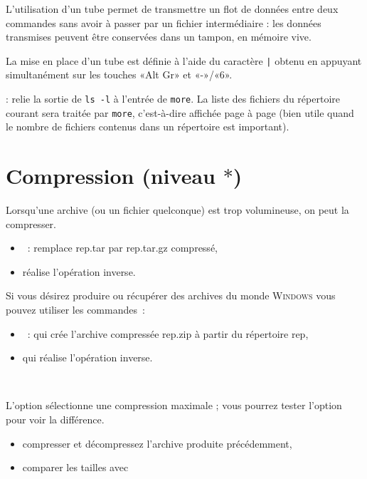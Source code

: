 \documentclass[a4paper,11pt]{article}
\begin{document}
L'utilisation d'un tube permet de transmettre un flot de données entre deux
commandes sans avoir à passer par un fichier intermédiaire : les données
transmises peuvent être conservées dans un tampon, en mémoire vive.

La mise en place d'un tube est définie à l'aide du caractère \verb!|! obtenu
en appuyant simultanément sur les touches «Alt Gr» et «-»/«6».

 : relie la sortie de  \verb!ls -l! à l'entrée de
\verb!more!. La liste des fichiers du répertoire courant sera traitée par
\verb!more!, c'est-à-dire affichée page à page (bien utile quand le nombre de
fichiers contenus dans un répertoire est important).

\section{Compression (niveau $*$)}
Lorsqu'une archive (ou un fichier quelconque) est trop volumineuse, on
peut la compresser.

\begin{itemize}
  \item {} : remplace rep.tar par rep.tar.gz compressé,
  \item {} réalise l'opération inverse.
\end{itemize}

Si vous désirez produire ou récupérer des archives du monde
\textsc{Windows} vous pouvez utiliser les commandes :
\begin{itemize}
  \item {} : qui crée l'archive compressée rep.zip à
        partir du répertoire rep,
  \item {} qui réalise l'opération inverse.
\end{itemize}

\

L'option  sélectionne une compression maximale ; vous pourrez tester
l'option  pour voir la différence.

\begin{maw}

\begin{itemize}
  \item compresser et décompressez l'archive produite précédemment,
  \item comparer les tailles avec 
\end{itemize}

\end{maw}
\end{document}
